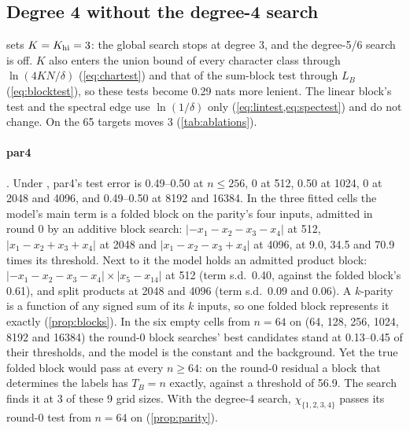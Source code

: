 \subsection{Degree 4 without the degree-4 search}\label{sec:abl-k3}

 sets $K=K_{\rm hi}=3$: the global search stops at degree 3, and the degree-5/6 search is off. $K$ also enters the union bound of every character class through $\ln(4KN/\delta)$ (\cref{eq:chartest}) and that of the sum-block test through $L_B$ (\cref{eq:blocktest}), so these tests become 0.29 nats more lenient. The linear block's test and the spectral edge use $\ln(1/\delta)$ only (\cref{eq:lintest,eq:spectest}) and do not change. On the 65 targets  moves 3 (\cref{tab:ablations}).

\paragraph{par4} . Under , par4's test error is 0.49--0.50 at $n\le256$, 0 at 512, 0.50 at 1024, 0 at 2048 and 4096, and 0.49--0.50 at 8192 and 16384. In the three fitted cells the model's main term is a folded block on the parity's four inputs, admitted in round 0 by an additive block search: $|{-x_1}-x_2-x_3-x_4|$ at 512, $|x_1-x_2+x_3+x_4|$ at 2048 and $|x_1-x_2-x_3+x_4|$ at 4096, at 9.0, 34.5 and 70.9 times its threshold. Next to it the model holds an admitted product block: $|{-x_1}-x_2-x_3-x_4|\times|x_5-x_{14}|$ at 512 (term s.d.\ 0.40, against the folded block's 0.61), and split products at 2048 and 4096 (term s.d.\ 0.09 and 0.06). A $k$-parity is a function of any signed sum of its $k$ inputs, so one folded block represents it exactly (\cref{prop:blocks}). In the six empty cells from $n=64$ on (64, 128, 256, 1024, 8192 and 16384) the round-0 block searches' best candidates stand at 0.13--0.45 of their thresholds, and the model is the constant and the background. Yet the true folded block would pass at every $n\ge64$: on the round-0 residual a block that determines the labels has $T_B=n$ exactly, against a threshold of 56.9. The search finds it at 3 of these 9 grid sizes. With the degree-4 search, $\chi_{\{1,2,3,4\}}$ passes its round-0 test from $n=64$ on (\cref{prop:parity}).

